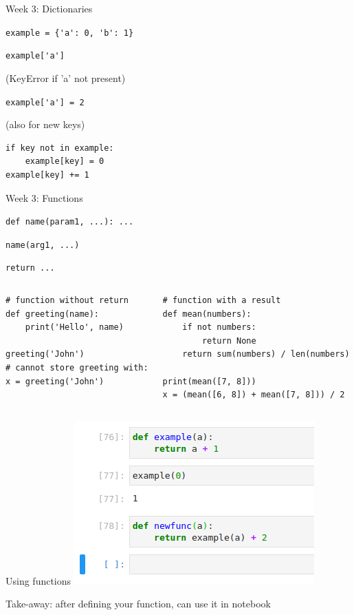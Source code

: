 \documentclass[aspectratio=169,usenames,dvipsnames]{beamer}
\begin{document}
\begin{frame}[fragile]{Week 3: Dictionaries}
    \begin{description}[creation]
        \item[creation] \lstinline|example = {'a': 0, 'b': 1}|
        \item[lookup] \lstinline{example['a']}

            (KeyError if 'a' not present)
        \item[update] \lstinline{example['a'] = 2}

            (also for new keys)
        \item[Dictionary idiom:]
    \end{description}
\begin{lstlisting}
if key not in example:
    example[key] = 0
example[key] += 1
\end{lstlisting}
\end{frame}

\begin{frame}[fragile]{Week 3: Functions}
    \begin{description}
        \item[Defining] \lstinline{def name(param1, ...): ...}
        \item[Calling] \lstinline{name(arg1, ...)}
        \item[Return value] \lstinline{return ...}
    \end{description}
    \pause
\begin{columns}[T]
\begin{lstlisting}
# function without return
def greeting(name):
    print('Hello', name)

greeting('John')
# cannot store greeting with:
x = greeting('John')
\end{lstlisting}
\pause
\begin{lstlisting}
# function with a result
def mean(numbers):
    if not numbers:
        return None
    return sum(numbers) / len(numbers)

print(mean([7, 8]))
x = (mean([6, 8]) + mean([7, 8])) / 2
\end{lstlisting}
\end{columns}
\end{frame}
\begin{frame}{Using functions}
    \includegraphics[height=0.5\textheight]{fig/func}

\vspace{1em}
Take-away: after defining your function, can use it  in notebook
\end{frame}
\end{document}
